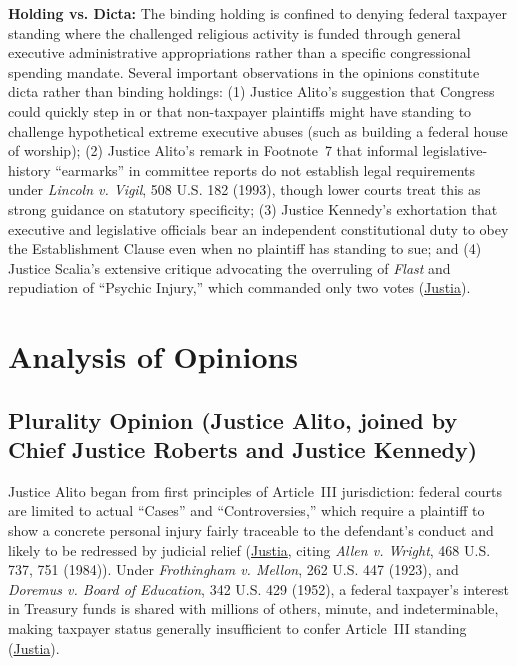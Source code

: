 \documentclass[12pt]{article}
\begin{document}
\textbf{Holding vs. Dicta:} The binding holding is confined to denying federal taxpayer standing where the challenged religious activity is funded through general executive administrative appropriations rather than a specific congressional spending mandate. Several important observations in the opinions constitute dicta rather than binding holdings: (1) Justice Alito's suggestion that Congress could quickly step in or that non-taxpayer plaintiffs might have standing to challenge hypothetical extreme executive abuses (such as building a federal house of worship); (2) Justice Alito's remark in Footnote~7 that informal legislative-history ``earmarks'' in committee reports do not establish legal requirements under \textit{Lincoln v. Vigil}, 508 U.S. 182 (1993), though lower courts treat this as strong guidance on statutory specificity; (3) Justice Kennedy's exhortation that executive and legislative officials bear an independent constitutional duty to obey the Establishment Clause even when no plaintiff has standing to sue; and (4) Justice Scalia's extensive critique advocating the overruling of \textit{Flast} and repudiation of ``Psychic Injury,'' which commanded only two votes (\href{https://supreme.justia.com/cases/federal/us/551/587/}{Justia}).

\section{Analysis of Opinions}

\subsection{Plurality Opinion (Justice Alito, joined by Chief Justice Roberts and Justice Kennedy)}

Justice Alito began from first principles of Article~III jurisdiction: federal courts are limited to actual ``Cases'' and ``Controversies,'' which require a plaintiff to show a concrete personal injury fairly traceable to the defendant's conduct and likely to be redressed by judicial relief (\href{https://supreme.justia.com/cases/federal/us/551/587/}{Justia}, citing \textit{Allen v. Wright}, 468 U.S. 737, 751 (1984)). Under \textit{Frothingham v. Mellon}, 262 U.S. 447 (1923), and \textit{Doremus v. Board of Education}, 342 U.S. 429 (1952), a federal taxpayer's interest in Treasury funds is shared with millions of others, minute, and indeterminable, making taxpayer status generally insufficient to confer Article~III standing (\href{https://supreme.justia.com/cases/federal/us/551/587/}{Justia}).
\end{document}
